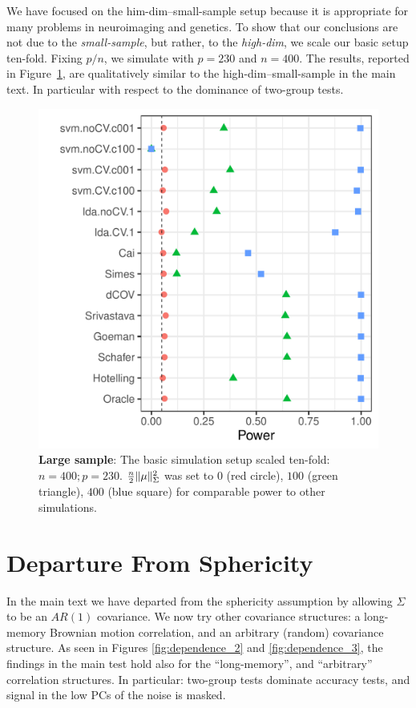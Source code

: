 \documentclass[]{bio}
\begin{document}
We have focused on the him-dim--small-sample setup because it is appropriate for many problems in neuroimaging and genetics. 
To show that our conclusions are not due to the \emph{small-sample}, but rather, to the \emph{high-dim}, we scale our basic setup ten-fold. 
Fixing $p/n$, we simulate with $p=230$ and $n=400$. 
The results, reported in Figure~\ref{fig:large-sample}, are qualitatively similar to the high-dim--small-sample in the main text.
In particular with respect to the dominance of two-group tests. 
\begin{figure}[h]
	\centering
	\includegraphics[width=0.45\columnwidth]{"art/file1"}
	\caption{\textbf{Large sample}: The basic simulation setup scaled ten-fold: $n=400; p=230$.
	$\frac{n}{2}\Vert \mu \Vert^2_\Sigma$ was set to $0$ (red circle), $100$ (green triangle), $400$ (blue square) for comparable power to other simulations.}
	\label{fig:large-sample}
\end{figure}





\section{Departure From Sphericity}
In the main text we have departed from the sphericity assumption by allowing $\Sigma$ to be an $AR(1)$ covariance. 
We now try other covariance structures: a long-memory Brownian motion correlation, and an arbitrary (random) covariance structure. 
As seen in Figures \ref{fig:dependence_2} and \ref{fig:dependence_3}, the findings in the main test hold also for the ``long-memory'', and ``arbitrary'' correlation structures.
In particular: two-group tests dominate accuracy tests, and signal in the low PCs of the noise is masked. 
\end{document}
